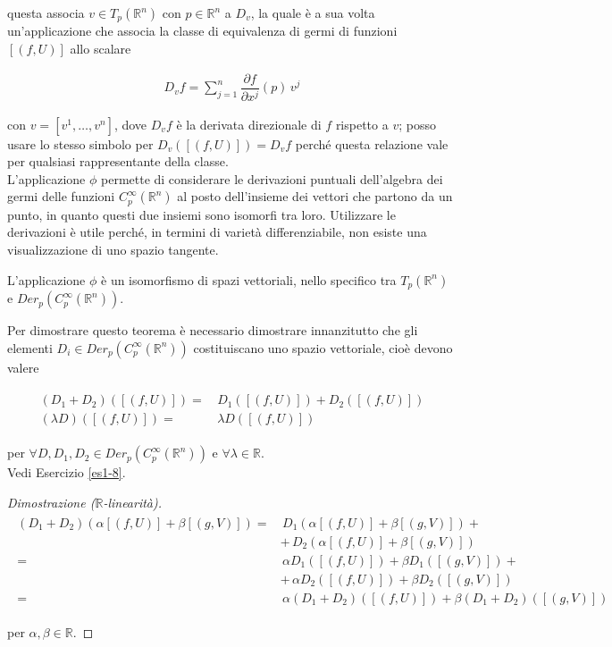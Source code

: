 questa associa $ v \in T_{p}(\mathbb{R}^{n}) $ con $ p \in \mathbb{R}^{n} $ a $ D_{v} $, la quale è a sua volta un'applicazione che associa la classe di equivalenza di germi di funzioni $ [(f,U)] $ allo scalare

\begin{align}
	D_{v} f = \sum_{j=1}^{n} \dfrac{\partial f}{\partial x^{j}} (p) \, v^{j}
\end{align}

con $ v = [v^{1},\dots,v^{n}] $, dove $ D_{v} f $ è la derivata direzionale di $ f $ rispetto a $ v $; posso usare lo stesso simbolo per $ D_{v} ([(f,U)]) = D_{v} f $ perché questa relazione vale per qualsiasi rappresentante della classe.\\
L'applicazione $ \phi $ permette di considerare le derivazioni puntuali dell'algebra dei germi delle funzioni $ C_{p}^{\infty}(\mathbb{R}^{n}) $ al posto dell'insieme dei vettori che partono da un punto, in quanto questi due insiemi sono isomorfi tra loro. Utilizzare le derivazioni è utile perché, in termini di varietà differenziabile, non esiste una visualizzazione di uno spazio tangente.

\begin{theorem}
	L'applicazione $ \phi $ è un isomorfismo di spazi vettoriali, nello specifico tra $ T_{p}(\mathbb{R}^{n}) $ e $ Der_{p}(C_{p}^{\infty}(\mathbb{R}^{n})) $.
\end{theorem}

Per dimostrare questo teorema è necessario dimostrare innanzitutto che gli elementi $ D_{i} \in Der_{p}(C_{p}^{\infty}(\mathbb{R}^{n})) $ costituiscano uno spazio vettoriale, cioè devono valere

\begin{align}
	\begin{split}
		(D_{1} + D_{2}) ([(f,U)]) =& \, D_{1}([(f,U)]) + D_{2}([(f,U)])\\
		(\lambda D) ([(f,U)]) =& \, \lambda D ([(f,U)])
	\end{split}
\end{align}

per $ \forall D,D_{1},D_{2} \in Der_{p}(C_{p}^{\infty}(\mathbb{R}^{n})) $ e $ \forall \lambda \in \mathbb{R} $.\\
Vedi Esercizio \ref{es1-8}.

\begin{proof}[Dimostrazione ($ \mathbb{R} $-linearità)]
	\begin{align}
		\begin{split}
			(D_{1} + D_{2}) (\alpha [(f,U)] + \beta [(g,V)]) =& \, D_{1} (\alpha [(f,U)] + \beta [(g,V)]) +\\
			&+ \, D_{2} (\alpha [(f,U)] + \beta [(g,V)])\\
			=& \, \alpha D_{1} ([(f,U)]) + \beta D_{1} ([(g,V)]) +\\
			&+ \,\alpha D_{2} ([(f,U)]) + \beta D_{2} ([(g,V)])\\
			=& \, \alpha (D_{1} + D_{2}) ([(f,U)]) + \beta (D_{1} + D_{2}) ([(g,V)])
		\end{split}
	\end{align}

	per $ \alpha,\beta \in \mathbb{R} $.
\end{proof}

